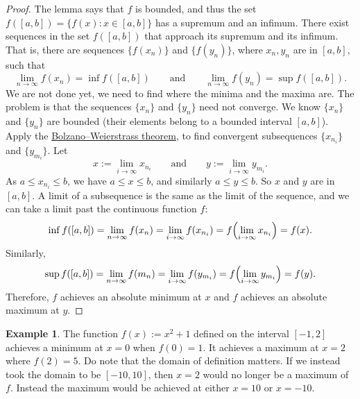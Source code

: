 \documentclass[12pt]{book}
\theoremstyle{plain}
\theoremstyle{remark}
\theoremstyle{definition}
\theoremstyle{exercise}
\theoremstyle{example}
\newtheorem{example}[thm]{Example}
\begin{document}
\begin{proof}
The lemma says that $f$ is bounded, and thus
the set $f([a,b]) = \{ f(x) : x \in [a,b] \}$ has a supremum and an infimum.
There exist sequences
in the set $f([a,b])$ that approach its supremum and its infimum.
That is, there are sequences
$\{ f(x_n) \}$ and $\{ f(y_n) \}$, where $x_n, y_n$ are in $[a,b]$,
such that
\begin{equation*}
\lim_{n\to\infty} f(x_n) = \inf f([a,b]) \qquad \text{and} \qquad
\lim_{n\to\infty} f(y_n) = \sup f([a,b]).
\end{equation*}
We are not done yet, we need to find where the minima and the maxima are.
The problem is that the sequences $\{ x_n \}$ and $\{ y_n \}$ need not
converge.
We know $\{ x_n \}$ and $\{ y_n \}$ are bounded (their elements
belong to 
a bounded interval $[a,b]$).
Apply the 
\hyperref[thm:bwseq]{Bolzano--Weierstrass theorem},
to find
convergent subsequences
$\{ x_{n_i} \}$ and 
$\{ y_{m_i} \}$.  Let
\begin{equation*}
x := \lim_{i\to\infty} x_{n_i}
\qquad \text{and} \qquad
y := \lim_{i\to\infty} y_{m_i}.
\end{equation*}
As $a \leq x_{n_i} \leq b$, we have $a \leq x \leq b$,
and similarly $a \leq y \leq b$.  So $x$ and $y$ are in $[a,b]$.
A limit of a subsequence is the same as the limit of the
sequence, and we can take a limit past the continuous function $f$:
\begin{equation*}
\inf f([a,b]) = \lim_{n\to\infty} f(x_n)
= \lim_{i\to\infty} f(x_{n_i}) = 
f \Bigl( \lim_{i\to\infty} x_{n_i} \Bigr) = f(x) .
\end{equation*}
Similarly,
\begin{equation*}
\sup f([a,b]) = \lim_{n\to\infty} f(m_n)
= \lim_{i\to\infty} f(y_{m_i}) = 
f \Bigl( \lim_{i\to\infty} y_{m_i} \Bigr) = f(y) .
\end{equation*}
Therefore, $f$ achieves an absolute minimum at $x$ and
$f$ achieves an absolute maximum at $y$.
\end{proof}

\begin{example}
The function $f(x) := x^2+1$ defined on the interval $[-1,2]$ achieves a minimum
at $x=0$ when $f(0) = 1$.  It achieves a maximum at $x=2$ where $f(2) = 5$.
Do note that the domain of definition matters.  If we instead took the domain
to be $[-10,10]$, then $x=2$ would no longer be a maximum of $f$.  Instead
the maximum would be achieved at either $x=10$ or $x=-10$.
\end{example}
\end{document}
